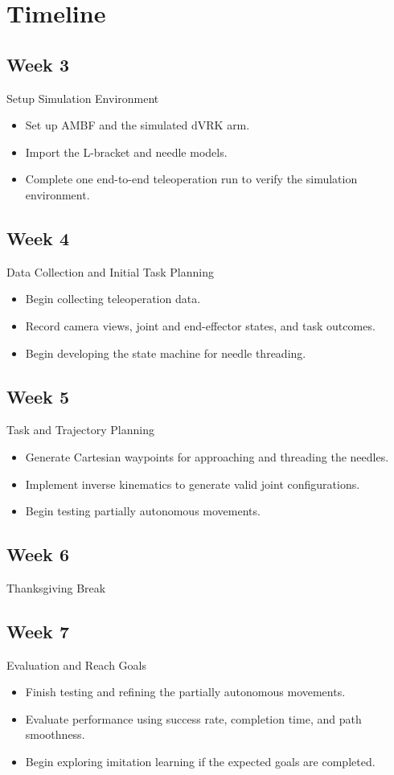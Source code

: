 \documentclass[conference]{IEEEtran}
\begin{document}


\section{Timeline}
\subsection*{Week 3}
Setup Simulation Environment
\begin{itemize}
\item{Set up AMBF and the simulated dVRK arm.}
\item{Import the L-bracket and needle models.}
\item{Complete one end-to-end teleoperation run to verify the simulation environment.}
\end{itemize}
\subsection*{Week 4}
Data Collection and Initial Task Planning
\begin{itemize}
\item{Begin collecting teleoperation data.}
\item{Record camera views, joint and end-effector states, and task outcomes.}
\item{Begin developing the state machine for needle threading.}
\end{itemize}
\subsection*{Week 5}
Task and Trajectory Planning
\begin{itemize}
\item{Generate Cartesian waypoints for approaching and threading the needles.}
\item{Implement inverse kinematics to generate valid joint configurations.}
\item{Begin testing partially autonomous movements.}
\end{itemize}
\subsection*{Week 6}
Thanksgiving Break
\subsection*{Week 7}
Evaluation and Reach Goals
\begin{itemize}
\item{Finish testing and refining the partially autonomous movements.}
\item{Evaluate performance using success rate, completion time, and path smoothness.}
\item{Begin exploring imitation learning if the expected goals are completed.}
\end{itemize}
\end{document}
